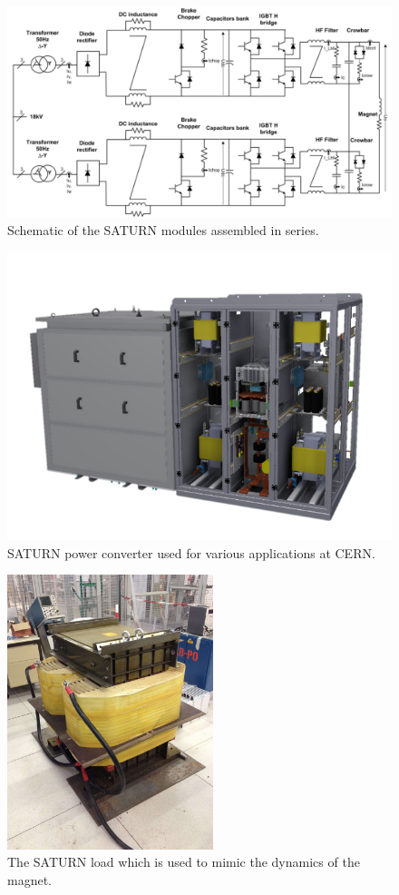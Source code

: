 \documentclass[a4paper, 10pt, conference]{ieeeconf}
\begin{document}
\begin{figure}
\centering
\includegraphics[width=\columnwidth]{../pics/schematic}
\caption{Schematic of the SATURN modules assembled in series.}
\label{fig:schematic}
\end{figure} 

\begin{figure}
\centering
\includegraphics[width=\columnwidth]{../pics/Saturn_1}
\caption{SATURN power converter used for various applications at CERN.}
\label{fig:saturn_pc}
\end{figure} 

\begin{figure}
\centering
\includegraphics[width=\columnwidth, height=8cm]{../pics/load}
\caption{The SATURN load which is used to mimic the dynamics of the magnet.}
\label{fig:load}
\end{figure} 
\end{document}
